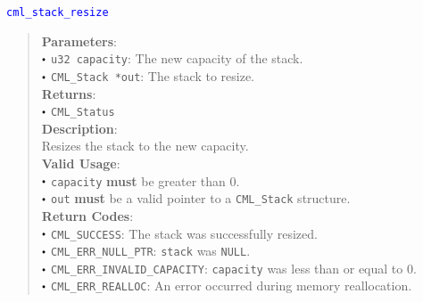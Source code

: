 \documentclass[a4paper,oneside,10pt]{article}
\newcommand{\function}[1]{
  \noindent\textcolor{blue}{\texttt{#1}}
  \vspace{-0.3em}
}
\renewcommand{\dot}{\raisebox{0.3ex}{\scalebox{0.6}{$\bullet$}}}
\theoremstyle{definition}
\begin{document}
\function{cml\_stack\_resize}
\begin{quote}
  \textbf{Parameters}: \\
  $\dot$ \texttt{u32 capacity}: The new capacity of the stack. \\
  $\dot$ \texttt{CML\_Stack *out}: The stack to resize. \\
  \textbf{Returns}: \\
  $\dot$ \texttt{CML\_Status} \\
  
  \vspace{-0.75em}
  \textbf{Description}: \\
  Resizes the stack to the new capacity. \\

  \vspace{-0.75em}
  \textbf{Valid Usage}: \\
  $\dot$ \texttt{capacity} \textbf{must} be greater than 0. \\
  $\dot$ \texttt{out} \textbf{must} be a valid pointer to a \texttt{CML\_Stack} structure. \\

  \vspace{-0.75em}
  \textbf{Return Codes}: \\
  $\dot$ \texttt{CML\_SUCCESS}: The stack was successfully resized. \\
  $\dot$ \texttt{CML\_ERR\_NULL\_PTR}: \texttt{stack} was \texttt{NULL}. \\
  $\dot$ \texttt{CML\_ERR\_INVALID\_CAPACITY}: \texttt{capacity} was less than or equal to 0. \\
  $\dot$ \texttt{CML\_ERR\_REALLOC}: An error occurred during memory reallocation. \\
\end{quote}
\end{document}

